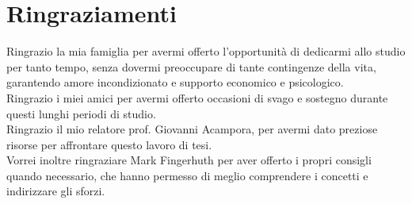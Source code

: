 



\bigskip

\begingroup
\let\clearpage\relax
\let\cleardoublepage\relax
\let\cleardoublepage\relax
\chapter*{Ringraziamenti}

Ringrazio la mia famiglia per avermi offerto l'opportunità di 
dedicarmi allo studio per tanto tempo, senza dovermi preoccupare 
di tante contingenze della vita, garantendo amore incondizionato 
e supporto economico e psicologico. \\
Ringrazio i miei amici per avermi offerto occasioni di svago 
e sostegno durante questi lunghi periodi di studio. \\
Ringrazio il mio relatore prof. Giovanni Acampora, per avermi dato 
preziose risorse per affrontare questo lavoro di tesi. \\
Vorrei inoltre ringraziare Mark Fingerhuth per aver offerto i 
propri consigli quando necessario, che hanno permesso di 
meglio comprendere i concetti e indirizzare gli sforzi. 

\bigskip



\endgroup
